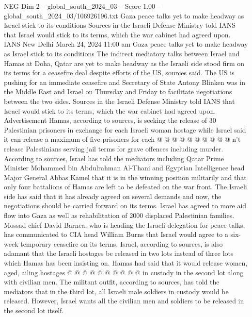\begin{textsample}{NEG Dim 2 – global\_south\_2024\_03 – Score 1.00 – global\_south\_2024\_03/106926196.txt}  \label{ex:f2_neg_434}
Gaza peace talks yet to make headway as Israel stick to its conditions Sources in the Israeli Defense Ministry told IANS that Israel would stick to its terms, which the war cabinet had agreed upon.
IANS New Delhi March 24, 2024 11:00 am Gaza peace talks yet to make headway as Israel stick to its conditions The indirect mediatory talks between Israel and Hamas at Doha, Qatar are yet to make headway as the Israeli side stood firm on its terms for a ceasefire deal despite efforts of the US, sources said.
The US is pushing for an immediate ceasefire and Secretary of State Antony Blinken was in the Middle East and Israel on Thursday and Friday to facilitate negotiations between the two sides.
Sources in the Israeli Defense Ministry told IANS that Israel would stick to its terms, which the war cabinet had agreed upon.
Advertisement Hamas, according to sources, is seeking the release of 30 Palestinian prisoners in exchange for each Israeli woman hostage while Israel said it can release a maximum of five prisoners for each @ @ @ @ @ @ @ @ @ @ n't release Palestinians serving jail terms for grave offences including murder.
According to sources, Israel has told the mediators including Qatar Prime Minister Mohammed bin Abdulrahman Al-Thani and Egyptian Intelligence head Major General Abbas Kamel that it is in the winning position militarily and that only four battalions of Hamas are left to be defeated on the war front.
The Israeli side has said that it has already agreed on several demands and now, the negotiations should be carried forward on its terms.
Israel has agreed to more aid flow into Gaza as well as rehabilitation of 2000 displaced Palestinian families.
Mossad chief David Barnea, who is heading the Israeli delegation for peace talks, has communicated to CIA head William Burns that Israel would agree to a six-week temporary ceasefire on its terms.
Israel, according to sources, is also adamant that the Israeli hostages be released in two lots instead of three lots which Hamas has been insisting on.
Hamas had said that it would release women, aged, ailing hostages @ @ @ @ @ @ @ @ @ @ in custody in the second lot along with civilian men.
The militant outfit, according to sources, has told the mediators that in the third lot, all Israeli male soldiers in custody would be released.
However, Israel wants all the civilian men and soldiers to be released in the second lot itself.

\end{textsample}

